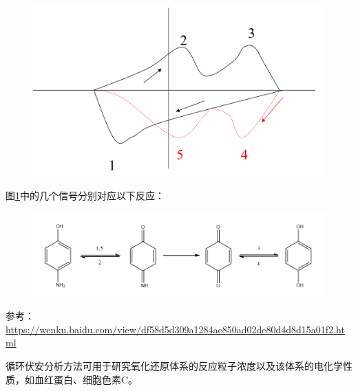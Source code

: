 \begin{example}
	\begin{figure}[!h]
		\centering
		\includegraphics[width=0.7\linewidth]{image/chp7_circular_VA_example}
		\caption{}
		\label{fig:chp7circularvaexample}
	\end{figure}

	图\ref{fig:chp7circularvaexample}中的几个信号分别对应以下反应：
	
	\begin{figure}[!h]
		\centering
		\includegraphics[width=\linewidth]{image/chp7_circular_VA_example_result}
		\label{fig:chp7circularvaexampleresult}
	\end{figure}
	
	参考：\url{https://wenku.baidu.com/view/df58d5d309a1284ac850ad02de80d4d8d15a01f2.html}
\end{example}
循环伏安分析方法可用于研究氧化还原体系的反应粒子浓度以及该体系的电化学性质，如血红蛋白、细胞色素C。
